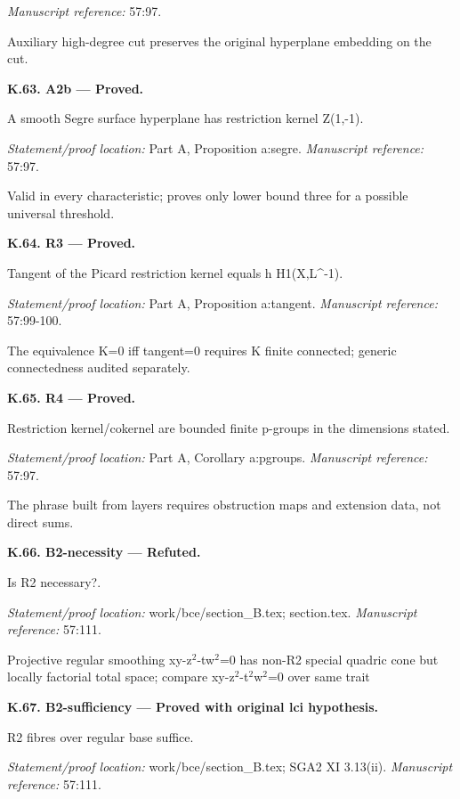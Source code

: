 \emph{Manuscript reference:} 57:97.
\par Auxiliary high-degree cut preserves the original hyperplane embedding on the cut.
\par\medskip\noindent\textbf{K.63. A2b --- Proved.}\par
A smooth Segre surface hyperplane has restriction kernel Z(1,-1).
\par\emph{Statement/proof location:} Part A, Proposition a:segre.
\emph{Manuscript reference:} 57:97.
\par Valid in every characteristic; proves only lower bound three for a possible universal threshold.
\par\medskip\noindent\textbf{K.64. R3 --- Proved.}\par
Tangent of the Picard restriction kernel equals h H1(X,L\textasciicircum{}-1).
\par\emph{Statement/proof location:} Part A, Proposition a:tangent.
\emph{Manuscript reference:} 57:99-100.
\par The equivalence K=0 iff tangent=0 requires K finite connected; generic connectedness audited separately.
\par\medskip\noindent\textbf{K.65. R4 --- Proved.}\par
Restriction kernel/cokernel are bounded finite p-groups in the dimensions stated.
\par\emph{Statement/proof location:} Part A, Corollary a:pgroups.
\emph{Manuscript reference:} 57:97.
\par The phrase built from layers requires obstruction maps and extension data, not direct sums.
\par\medskip\noindent\textbf{K.66. B2-necessity --- Refuted.}\par
Is R2 necessary?.
\par\emph{Statement/proof location:} work/bce/section\_B.tex; section.tex.
\emph{Manuscript reference:} 57:111.
\par Projective regular smoothing xy-z\ensuremath{{}^2}-tw\ensuremath{{}^2}=0 has non-R2 special quadric cone but locally factorial total space; compare xy-z\ensuremath{{}^2}-t\ensuremath{{}^2}w\ensuremath{{}^2}=0 over same trait
\par\medskip\noindent\textbf{K.67. B2-sufficiency --- Proved with original lci hypothesis.}\par
R2 fibres over regular base suffice.
\par\emph{Statement/proof location:} work/bce/section\_B.tex; SGA2 XI 3.13(ii).
\emph{Manuscript reference:} 57:111.
